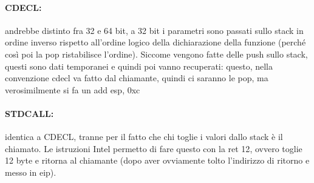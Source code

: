 \documentclass{article}
\begin{document}
\paragraph{CDECL:} andrebbe distinto fra 32 e 64 bit, a 32 bit i parametri sono passati sullo stack in ordine inverso rispetto all'ordine logico della dichiarazione della funzione (perché così poi la pop ristabilisce l'ordine). Siccome vengono fatte delle push sullo stack, questi sono dati temporanei e quindi poi vanno recuperati: questo, nella convenzione cdecl va fatto dal chiamante, quindi ci saranno le pop, ma verosimilmente si fa un \textsf{add esp, 0xc}
\paragraph{STDCALL:} identica a CDECL, tranne per il fatto che chi toglie i valori dallo stack è il chiamato. Le istruzioni Intel permetto di fare questo con la \textsf{ret 12}, ovvero toglie 12 byte e ritorna al chiamante (dopo aver ovviamente tolto l'indirizzo di ritorno e messo in eip).
\end{document}
